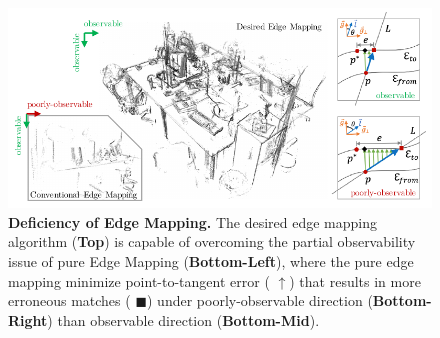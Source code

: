 \begin{figure}[t] 
  	\centering
  	\includegraphics[width=\linewidth]{figures/illumination/edge_deficiency.pdf}
    \caption[Deficiency of Edge Mapping]{\textbf{Deficiency of Edge Mapping.} The desired edge mapping algorithm (\textbf{Top}) is capable of overcoming the partial observability issue of pure Edge Mapping (\textbf{Bottom-Left}), where the pure edge mapping minimize point-to-tangent error ({\color{green!50!black} $\uparrow$}) that results in more erroneous matches ({\color{red} $\blacksquare$}) under poorly-observable direction (\textbf{Bottom-Right}) than observable direction (\textbf{Bottom-Mid}).
    \label{fig:illumination_edgedeficiency}}
\end{figure}

